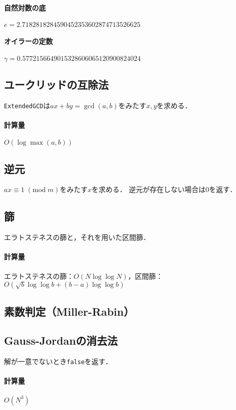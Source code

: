 \documentclass[landscape,twocolumn,9pt]{jsarticle}
\begin{document}
\paragraph{自然対数の底} \hspace{2.66mm}
$ e=     2.7182818284590452353602874713526625 $
\paragraph{オイラーの定数}
$ \gamma=0.5772156649015328606065120900824024 $

\subsection{ユークリッドの互除法}
\texttt{ExtendedGCD}は$ax+by=\gcd(a,b)$をみたす$x,y$を求める．
\paragraph{計算量} $O(\log\max(a,b))$


\subsection{逆元}
$ax\equiv 1\; (\mathrm{mod}\; m)$をみたす$x$を求める．
逆元が存在しない場合は0を返す．


\subsection{篩}
エラトステネスの篩と，それを用いた区間篩．
\paragraph{計算量} エラトステネスの篩：$O(N\log\log N)$，区間篩：$O(\sqrt b \log\log b+(b-a)\log\log b)$


\subsection{素数判定（Miller-Rabin）}


\subsection{Gauss-Jordanの消去法}
解が一意でないとき\texttt{false}を返す．
\paragraph{計算量} $O(N^3)$

\end{document}
